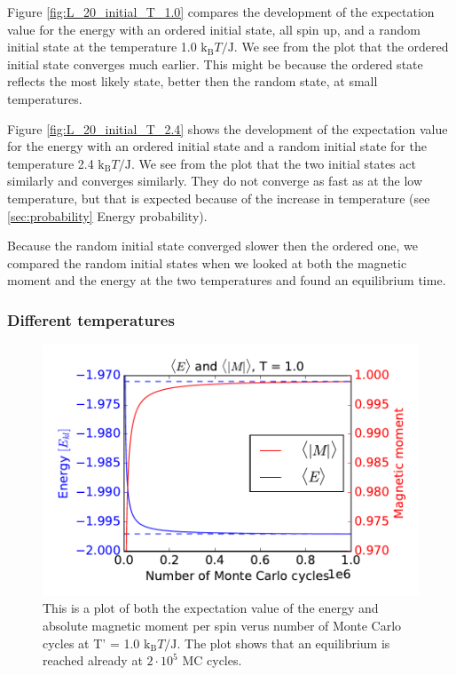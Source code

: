 Figure \ref{fig:L_20_initial_T_1.0} compares the development of the expectation value for the energy with an ordered initial state, all spin up, and a random initial state at the temperature 1.0 $\text{k}_\text{B}T/\text{J}$. We see from the plot that the ordered initial state converges much earlier. This might be because the ordered state reflects the most likely state, better then the random state, at small temperatures.

Figure \ref{fig:L_20_initial_T_2.4} shows the development of the expectation value for the energy with an ordered initial state and a random initial state for the temperature 2.4 $\text{k}_\text{B}T/\text{J}$. We see from the plot that the two initial states act similarly and converges similarly. They do not converge as fast as at the low temperature, but that is expected because of the increase in temperature (see \ref{sec:probability} Energy probability).

Because the random initial state converged slower then the ordered one, we compared the random initial states when we looked at both the magnetic moment and the energy at the two temperatures and found an equilibrium time.

\subsubsection{Different temperatures}


\begin{figure}[H]
\includegraphics[width=\linewidth]{../results/4c/En_mag_T1_0}\caption{This is a plot of both the expectation value of the energy and absolute magnetic moment per spin verus number of Monte Carlo cycles at T' = 1.0 $\text{k}_\text{B}T/\text{J}$. The plot shows that an equilibrium is reached already at $2 \cdot 10^{5}$ MC cycles.}\label{fig:L_20_energy_mag_T_1.0}
\end{figure}

